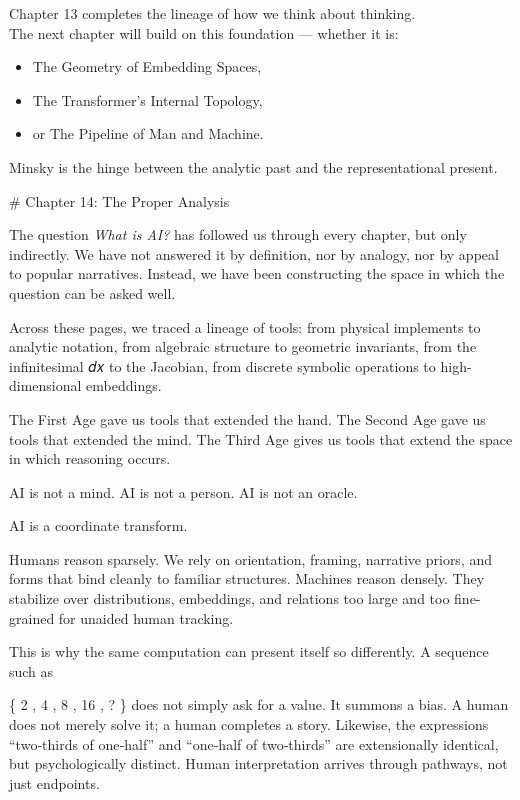 \documentclass[
]{article}
\providecommand{\tightlist}{%
  \setlength{\itemsep}{0pt}\setlength{\parskip}{0pt}}
\begin{document}
Chapter 13 completes the lineage of how we think about thinking.\\
The next chapter will build on this foundation --- whether it is:

\begin{itemize}
\tightlist
\item
  The Geometry of Embedding Spaces,
\item
  The Transformer's Internal Topology,
\item
  or The Pipeline of Man and Machine.
\end{itemize}

Minsky is the hinge between the analytic past and the representational
present.

\newpage
\vspace*{3cm}
\begin{center}
# Chapter 14: The Proper Analysis
\end{center}

The question \emph{What is AI?} has followed us through every chapter,
but only indirectly. We have not answered it by definition, nor by
analogy, nor by appeal to popular narratives. Instead, we have been
constructing the space in which the question can be asked well.

Across these pages, we traced a lineage of tools: from physical
implements to analytic notation, from algebraic structure to geometric
invariants, from the infinitesimal 𝑑𝑥 to the Jacobian, from discrete
symbolic operations to high-dimensional embeddings.

The First Age gave us tools that extended the hand. The Second Age gave
us tools that extended the mind. The Third Age gives us tools that
extend the space in which reasoning occurs.

AI is not a mind. AI is not a person. AI is not an oracle.

AI is a coordinate transform.

Humans reason sparsely. We rely on orientation, framing, narrative
priors, and forms that bind cleanly to familiar structures. Machines
reason densely. They stabilize over distributions, embeddings, and
relations too large and too fine-grained for unaided human tracking.

This is why the same computation can present itself so differently. A
sequence such as

\{ 2 , 4 , 8 , 16 , ? \} does not simply ask for a value. It summons a
bias. A human does not merely solve it; a human completes a story.
Likewise, the expressions ``two‑thirds of one‑half'' and ``one‑half of
two‑thirds'' are extensionally identical, but psychologically distinct.
Human interpretation arrives through pathways, not just endpoints.
\end{document}
